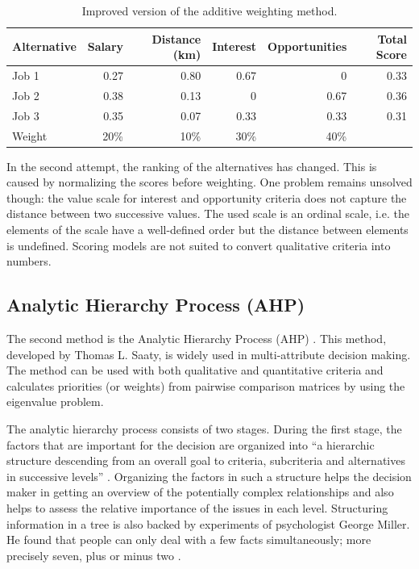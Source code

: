 \begin{table}[h]
    \begin{center}
        \begin{tabular}{lrrrrr}
            \hline
            Alternative & Salary & Distance (km) & Interest & Opportunities & Total Score \\
            \hline
            Job 1       & 0.27   & 0.80          & 0.67     & 0             & 0.33        \\
            Job 2       & 0.38   & 0.13          & 0        & 0.67          & 0.36        \\
            Job 3       & 0.35   & 0.07          & 0.33     & 0.33          & 0.31        \\
            \hline
            Weight      & 20\%   & 10\%          & 30\%     & 40\%          &             \\
            \hline
        \end{tabular}
        \caption{Improved version of the additive weighting method.}
        \label{tab:sm2}
    \end{center}
\end{table}

In the second attempt, the ranking of the alternatives has changed. This is caused by normalizing the scores before weighting. One problem remains unsolved though: the value scale for interest and opportunity criteria does not capture the distance between two successive values. The used scale is an ordinal scale, i.e. the elements of the scale have a well-defined order but the distance between elements is undefined. Scoring models are not suited to convert qualitative criteria into numbers.

\subsection{Analytic Hierarchy Process (AHP)}
\label{sec:ahp}

The second method is the Analytic Hierarchy Process (AHP) \cite{Saaty:1980}. This method, developed by Thomas L. Saaty, is widely used in multi-attribute decision making. The method can be used with both qualitative and quantitative criteria and calculates priorities (or weights) from pairwise comparison matrices by using the eigenvalue problem. 

The analytic hierarchy process consists of two stages. During the first stage, the factors that are important for the decision are organized into ``a hierarchic structure descending from an overall goal to criteria, subcriteria and alternatives in successive levels'' \cite{Saaty:1990}. Organizing the factors in such a structure helps the decision maker in getting an overview of the potentially complex relationships and also helps to assess the relative importance of the issues in each level. Structuring information in a tree is also backed by experiments of psychologist George Miller. He found that people can only deal with a few facts simultaneously; more precisely seven, plus or minus two \cite{Miller:1956}. 

